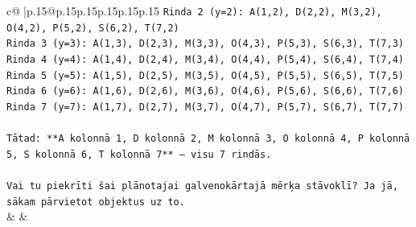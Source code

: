 \documentclass{article}
\begin{document}
{\begin{supertabular}{c@{$\;$}|p{.15\linewidth}@{}p{.15\linewidth}p{.15\linewidth}p{.15\linewidth}p{.15\linewidth}p{.15\linewidth}}
{{{\texttt{Rinda 2 (y=2): A(1,2), D(2,2), M(3,2), O(4,2), P(5,2), S(6,2), T(7,2)} \\
\texttt{Rinda 3 (y=3): A(1,3), D(2,3), M(3,3), O(4,3), P(5,3), S(6,3), T(7,3)} \\
\texttt{Rinda 4 (y=4): A(1,4), D(2,4), M(3,4), O(4,4), P(5,4), S(6,4), T(7,4)} \\
\texttt{Rinda 5 (y=5): A(1,5), D(2,5), M(3,5), O(4,5), P(5,5), S(6,5), T(7,5)} \\
\texttt{Rinda 6 (y=6): A(1,6), D(2,6), M(3,6), O(4,6), P(5,6), S(6,6), T(7,6)} \\
\texttt{Rinda 7 (y=7): A(1,7), D(2,7), M(3,7), O(4,7), P(5,7), S(6,7), T(7,7)} \\
\\ 
\texttt{Tātad: **A kolonnā 1, D kolonnā 2, M kolonnā 3, O kolonnā 4, P kolonnā 5, S kolonnā 6, T kolonnā 7** — visu 7 rindās.} \\
\\ 
\texttt{Vai tu piekrīti šai plānotajai galvenokārtajā mērķa stāvoklī? Ja jā, sākam pārvietot objektus uz to.} \\
            }
        }
    }
    & & \\ \\


\end{supertabular}}
\end{document}

